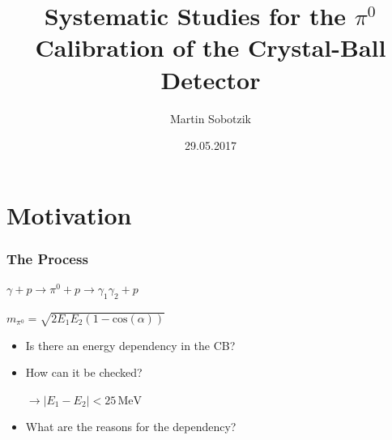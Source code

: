 \documentclass[slidestop,compress,mathserif]{beamer}
\title{Systematic Studies for the $\pi^0$ Calibration of the Crystal-Ball Detector}
\author{Martin Sobotzik}
\institute{Johannes Gutenberg-Universit\"at Mainz}
\date{29.05.2017}
\begin{document}
 

\begin{frame} 
\titlepage 
\end{frame} 


\section{Motivation}
\begin{frame}

		\frametitle{The Process}
	
		\begin{center}
		$	\gamma + p \rightarrow \pi^0 +p \rightarrow \gamma_1 \gamma_2 + p$
		\end{center}
		\begin{center}
		$m_{\pi^0}=\sqrt{2 E_1E_2(1-\text{cos}(\alpha))}$
		\end{center}
		\pause
			\begin{itemize}
				\item Is there an energy dependency in the CB?
				\pause
		\item How can it be checked?

		 
		 
		 $\rightarrow |E_1 - E_2|<25\,\text{MeV}$
		\pause

		\item What are the reasons for the dependency?
	\end{itemize}
\end{frame}
\end{document}

